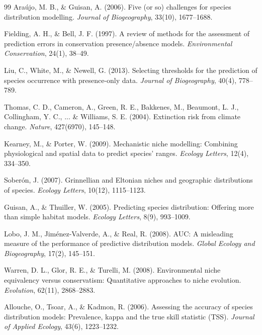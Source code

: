 \documentclass[11pt,a4paper]{article}
\begin{document}
\begin{thebibliography}{99}
Araújo, M. B., \& Guisan, A. (2006). Five (or so) challenges for species distribution modelling. \textit{Journal of Biogeography}, 33(10), 1677--1688.

Fielding, A. H., \& Bell, J. F. (1997). A review of methods for the assessment of prediction errors in conservation presence/absence models. \textit{Environmental Conservation}, 24(1), 38--49.

Liu, C., White, M., \& Newell, G. (2013). Selecting thresholds for the prediction of species occurrence with presence-only data. \textit{Journal of Biogeography}, 40(4), 778--789.

Thomas, C. D., Cameron, A., Green, R. E., Bakkenes, M., Beaumont, L. J., Collingham, Y. C., ... \& Williams, S. E. (2004). Extinction risk from climate change. \textit{Nature}, 427(6970), 145--148.

Kearney, M., \& Porter, W. (2009). Mechanistic niche modelling: Combining physiological and spatial data to predict species' ranges. \textit{Ecology Letters}, 12(4), 334--350.

Soberón, J. (2007). Grinnellian and Eltonian niches and geographic distributions of species. \textit{Ecology Letters}, 10(12), 1115--1123.

Guisan, A., \& Thuiller, W. (2005). Predicting species distribution: Offering more than simple habitat models. \textit{Ecology Letters}, 8(9), 993--1009.

Lobo, J. M., Jiménez-Valverde, A., \& Real, R. (2008). AUC: A misleading measure of the performance of predictive distribution models. \textit{Global Ecology and Biogeography}, 17(2), 145--151.

Warren, D. L., Glor, R. E., \& Turelli, M. (2008). Environmental niche equivalency versus conservatism: Quantitative approaches to niche evolution. \textit{Evolution}, 62(11), 2868--2883.

Allouche, O., Tsoar, A., \& Kadmon, R. (2006). Assessing the accuracy of species distribution models: Prevalence, kappa and the true skill statistic (TSS). \textit{Journal of Applied Ecology}, 43(6), 1223--1232.

\end{thebibliography}
\end{document}
